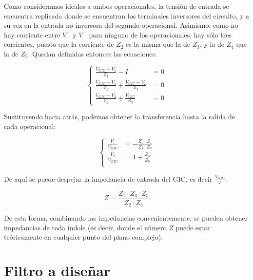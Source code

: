 \documentclass[../../tc_tp3_main.tex]{subfiles}
\begin{document}
Como consideramos ideales a ambos operacionales, la tensi\'on de entrada se encuentra replicada donde se encuentran los terminales inversores del circuito, y a su vez en la entrada no inversora del segundo operacional. Asimismo, como no hay corriente entre $V^+$ y $V^-$ para ninguno de los operacionales, hay s\'olo tres corrientes, puesto que la corriente de $Z_2$ es la misma que la de $Z_3$, y la de $Z_4$ que la de $Z_5$. Quedan definidas entonces las ecuaciones:


 \[
	\left\{
 	\begin{aligned}
		 \frac{V_{GIC} - V_1}{Z_1} - I &= 0\\
		\frac{V_{GIC} - V_1}{Z_2} + \frac{V_{GIC} - V_2}{Z_3} &= 0 \\ 
		\frac{V_{GIC} - V_2}{Z_4} + \frac{V_{GIC}}{Z_5} &= 0
	\end{aligned}
	\right.
 \]
 
 Sustituyendo hacia atr\'as, podemos obtener la transferencia hasta la salida de cada operacional:
 
\begin{equation}
	\label{eq:1-v1v2g}
	\left\{
 	\begin{aligned}
		\frac{V_1}{V_{GIC}} & =  -\frac{Z_2 \cdot Z_4}{Z_3 \cdot Z_5}\\
		\frac{V_2}{V_{GIC}} & =  1+ \frac{Z_4}{Z_5} \\ 
	\end{aligned}
	\right.
 \end{equation}
 
 
 
 De aqu\'i se puede despejar la impedancia de entrada del GIC, es decir $\frac{V_{GIC}}{I}$:
 
 \begin{equation}
 	\label{eq:1-z-gic-g}
 	Z = \frac{Z_1 \cdot Z_3 \cdot Z_5}{Z_2 \cdot Z_4}
 \end{equation}

De esta forma, combinando las impedancias convenientemente, se pueden obtener impedancias de toda \'indole (es decir, donde el n\'umero $Z$ puede estar te\'oricamente en cualquier punto del plano complejo). 





\section{Filtro a dise\~nar}
\end{document}
